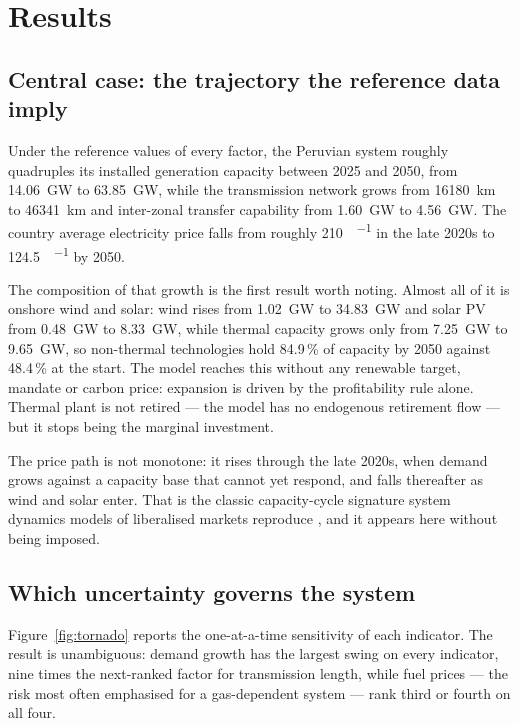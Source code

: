 \section{Results}
\label{sec:results}

\subsection{Central case: the trajectory the reference data imply}
\label{sec:results:base}

Under the reference values of every factor, the Peruvian system roughly quadruples
its installed generation capacity between 2025 and 2050, from \SI{14.06}{\giga\watt}
to \SI{63.85}{\giga\watt}, while the transmission network grows from
\SI{16180}{\kilo\meter} to \SI{46341}{\kilo\meter} and inter-zonal transfer
capability from \SI{1.60}{\giga\watt} to \SI{4.56}{\giga\watt}. The country average
electricity price falls from roughly \SI{210}{\USD\per\MWh} in the late
2020s to \SI{124.5}{\USD\per\MWh} by 2050.

The composition of that growth is the first result worth noting. Almost all of it is
onshore wind and solar: wind rises from \SI{1.02}{\giga\watt} to
\SI{34.83}{\giga\watt} and solar PV from \SI{0.48}{\giga\watt} to
\SI{8.33}{\giga\watt}, while thermal capacity grows only from \SI{7.25}{\giga\watt} to
\SI{9.65}{\giga\watt}, so non-thermal technologies hold 84.9\,\% of capacity by 2050
against 48.4\,\% at the start. The model reaches this without any renewable target,
mandate or carbon price: expansion is driven by the profitability rule alone. Thermal
plant is not retired --- the model has no endogenous retirement flow --- but it stops
being the marginal investment.

The price path is not monotone: it rises through the late 2020s, when demand grows
against a capacity base that cannot yet respond, and falls thereafter as wind and solar
enter. That is the classic capacity-cycle signature system dynamics models of
liberalised markets reproduce \citep{ford2001,arango2007,simshauser2010}, and it
appears here without being imposed.

\subsection{Which uncertainty governs the system}
\label{sec:results:ranking}

Figure~\ref{fig:tornado} reports the one-at-a-time sensitivity of each indicator. The
result is unambiguous: demand growth has the largest swing on every indicator, nine
times the next-ranked factor for transmission length, while fuel prices --- the risk most
often emphasised for a gas-dependent system --- rank third or fourth on all four.

